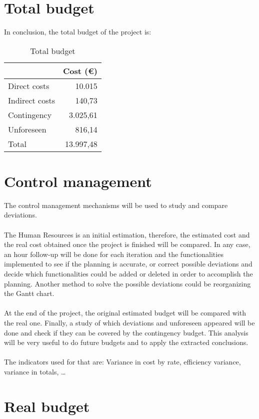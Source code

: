 \section{Total budget}
In conclusion, the total budget of the project is:
\begin{table}[h!]
	\centering
	\begin{tabular}{l|r|}
		\cline{2-2}
		& \multicolumn{1}{l|}{Cost (€)} \\ \hline
		\multicolumn{1}{|l|}{Direct costs} & 10.015\\ \hline
		\multicolumn{1}{|l|}{Indirect costs}& 140,73\\ \hline
		\multicolumn{1}{|l|}{Contingency} & 3.025,61\\ \hline
		\multicolumn{1}{|l|}{Unforeseen} & 816,14\\ \hline\hline
		\multicolumn{1}{|l|}{Total} & 13.997,48\\ \hline
	\end{tabular}
	\caption{Total budget}
	\label{TotalBudget}
\end{table}
\section{Control management}
The control management mechanisms will be used to study and compare deviations.\\\\
The Human Resources is an initial estimation, therefore, the estimated cost and the real cost obtained once the project is finished will be compared. In any case, an hour follow-up will be done for each iteration and the functionalities implemented to see if the planning is accurate, or correct possible deviations and decide which functionalities could be added or deleted in order to accomplish the planning. Another method to solve the possible deviations could be reorganizing the Gantt chart. \\\\
At the end of the project, the original estimated budget will be compared with the real one. Finally, a study of which deviations and unforeseen appeared will be done and check if they can be covered by the contingency budget. This analysis will be very useful to do future budgets and to apply the extracted conclusions. \\\\
The indicators used for that are: Variance in cost by rate, efficiency variance, variance in totals, \ldots

\section{Real budget}

